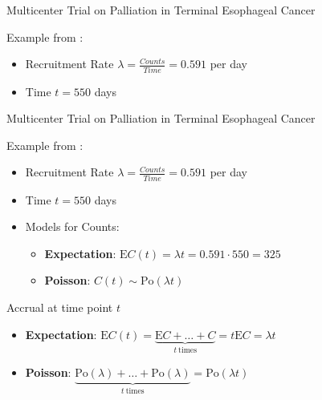 \documentclass[english]{beamer}\usepackage[]{graphicx}\usepackage[]{xcolor}
\begin{document}
\begin{frame}{Multicenter Trial on Palliation in Terminal Esophageal Cancer}

Example from \cite{carter2004application}:
\begin{itemize}
\item Recruitment Rate $\lambda = \frac{Counts}{Time} = 0.591$ per day
\item Time $t = 550$ days
\end{itemize}

\end{frame}


\begin{frame}{Multicenter Trial on Palliation in Terminal Esophageal Cancer}

Example from \cite{carter2004application}:
\begin{itemize}
\item Recruitment Rate $\lambda = \frac{Counts}{Time} = 0.591$ per day
\item Time $t = 550$ days
\item Models for Counts:
	\begin{itemize}
	\item \textbf{Expectation}: $\textrm{E}C(t) = \lambda t = 0.591 \cdot 550 = 325$
	\item \textbf{Poisson}: $C(t) \sim \textrm{Po}(\lambda t)$
	\end{itemize}
\end{itemize}

\end{frame}




\begin{frame}{Accrual at time point $t$}
\begin{itemize}
\item \textbf{Expectation}: $\textrm{E}C(t) = \underbrace{\textrm{E} C +\ldots + C}_{t \ \text{times}} = t \textrm{E} C = \lambda t$
\item \textbf{Poisson}: $\underbrace{\textrm{Po} (\lambda) +\ldots +\textrm{Po} (\lambda)}_{t \ \text{times}} = \textrm{Po} (\lambda t)$
\end{itemize}
\end{frame}
\end{document}
